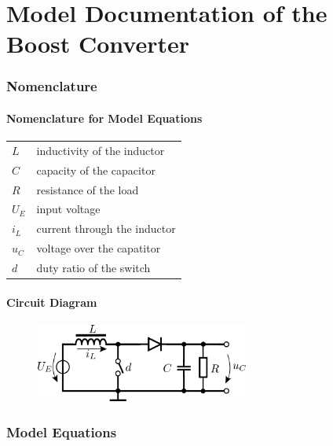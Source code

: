 \documentclass[10pt,a4paper]{article}
\begin{document}
	\part*{Model Documentation of the \\ Boost Converter} %
	
	
	\section{Nomenclature} %
	\subsection{Nomenclature for Model Equations} %
	
	\begin{tabular}{ll}
		$L$ & inductivity of the inductor \\
		$C$ & capacity of the capacitor \\
		$R$ & resistance of the load \\
		$U_E$ & input voltage \\
		$i_L$ & current through the inductor \\
		$u_C$ & voltage over the capatitor \\
		$d$ & duty ratio of the switch \\

		
				
	\end{tabular}

	\subsection{Circuit Diagram}
	\begin{figure}[H]
		\includegraphics[width=70mm]{boost_converter_circuit.pdf}
	\end{figure}
	
	
	\section{Model Equations} %
	
\end{document}
